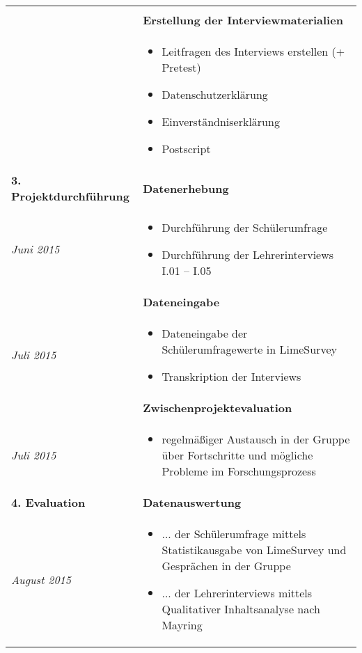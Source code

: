 \begin{longtable}{l|p{9.8cm}}
\begin{itemize}[nosep,topsep=-0.6cm]
	\end{itemize} \\
	& \textbf{Erstellung der Interviewmaterialien} \\*
	& 
	\vspace*{-0.6cm}
	\begin{itemize}[nosep,topsep=-0.6cm]
		\item Leitfragen des Interviews erstellen (+ Pretest)
		\item Datenschutzerklärung
		\item Einverständniserklärung
		\item Postscript
	\end{itemize} \\
	
	\textbf{3. Projektdurchführung} & \textbf{Datenerhebung} \\*
	\emph{Juni 2015} &
	\vspace*{-0.6cm}
	\begin{itemize}[nosep,topsep=-0.6cm]
		\item Durchführung der Schülerumfrage
		\item Durchführung der Lehrerinterviews I.01 -- I.05
	\end{itemize} \\
	& \textbf{Dateneingabe} \\*
	\emph{Juli 2015} &
	\vspace*{-0.6cm}
	\begin{itemize}[nosep,topsep=-0.6cm]
		\item Dateneingabe der Schülerumfragewerte in LimeSurvey
		\item Transkription der Interviews
	\end{itemize} \\
	& \textbf{Zwischenprojektevaluation} \\*
	\emph{Juli 2015} &
	\vspace*{-0.6cm}
	\begin{itemize}[nosep,topsep=-0.6cm]
		\item regelmäßiger Austausch in der Gruppe über Fortschritte und mögliche Probleme im Forschungsprozess
	\end{itemize} \\
	
	\textbf{4. Evaluation} & \textbf{Datenauswertung} \\*
	\emph{August 2015} &
	\vspace*{-0.6cm}
	\begin{itemize}[nosep,topsep=-0.6cm]
		\item ... der Schülerumfrage mittels Statistikausgabe von LimeSurvey und Gesprächen in der Gruppe
		\item ... der Lehrerinterviews mittels Qualitativer Inhaltsanalyse nach Mayring
	\end{itemize} \\
	

\end{longtable}
